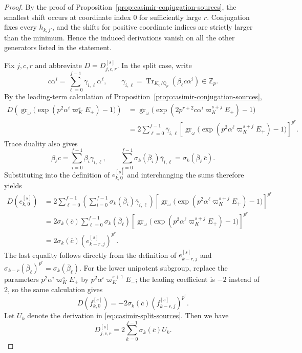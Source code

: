 \documentclass[11pt]{article}
\numberwithin{equation}{section}
\theoremstyle{definition}
\theoremstyle{remark}
\newcommand{\Q}{\mathbb Q}
\newcommand{\Z}{\mathbb Z}
\DeclareMathOperator{\gr}{gr}
\begin{document}
\begin{proof}
By the proof of Proposition~\ref{prop:casimir-conjugation-sources},
the smallest shift occurs at coordinate index $0$ for sufficiently
large $r$. Conjugation fixes every $h_{k,j'}$, and the shifts for
positive coordinate indices are strictly larger than the minimum.
Hence the induced derivations
vanish on all the other generators listed in the statement.

Fix $j,c,r$ and abbreviate $D=D^{[s]}_{j,c,r}$.
In the split case, write
\[
 c\alpha^i=\sum_{\ell=0}^{f-1}\gamma_{i,\ell}\alpha^\ell,
 \qquad
 \gamma_{i,\ell}
 =\operatorname{Tr}_{K_0/\Q_p}(\beta_\ell c\alpha^i)\in\Z_p.
\]
By the leading-term calculation of
Proposition~\ref{prop:casimir-conjugation-sources},
\[
 \begin{aligned}
 D\left(\gr_\omega\bigl(
       \exp(p^2\alpha^i\varpi_K^sE_+)-1\bigr)\right)
 &=\gr_\omega\bigl(
       \exp(2p^{r+2}c\alpha^i\varpi_K^{s+j}E_+)-1\bigr)\\
 &=2\sum_{\ell=0}^{f-1}\overline\gamma_{i,\ell}
       \left[\gr_\omega\bigl(
       \exp(p^2\alpha^\ell\varpi_K^{s+j}E_+)-1\bigr)\right]^{p^r}.
 \end{aligned}
\]
Trace duality also gives
\[
 \beta_\ell c=\sum_{i=0}^{f-1}\beta_i\gamma_{i,\ell},
 \qquad
 \sum_{i=0}^{f-1}\sigma_k(\overline\beta_i)
                  \overline\gamma_{i,\ell}
     =\sigma_k(\overline\beta_\ell\,\overline c).
\]
Substituting into the definition of $e_{k,0}^{[s]}$ and
interchanging the sums therefore yields
\[
 \begin{aligned}
 D(e_{k,0}^{[s]})
 &=2\sum_{\ell=0}^{f-1}
       \left(\sum_{i=0}^{f-1}\sigma_k(\overline\beta_i)
                    \overline\gamma_{i,\ell}\right)
       \left[\gr_\omega\bigl(
       \exp(p^2\alpha^\ell\varpi_K^{s+j}E_+)-1\bigr)\right]^{p^r}\\
 &=2\sigma_k(\overline c)\sum_{\ell=0}^{f-1}
       \sigma_k(\overline\beta_\ell)
       \left[\gr_\omega\bigl(
       \exp(p^2\alpha^\ell\varpi_K^{s+j}E_+)-1\bigr)\right]^{p^r}\\
 &=2\sigma_k(\overline c)(e_{k-r,j}^{[s]})^{p^r}.
 \end{aligned}
\]
The last equality follows directly from the definition of
$e_{k-r,j}^{[s]}$ and
$\sigma_{k-r}(\overline\beta_\ell)^{p^r}=\sigma_k(\overline\beta_\ell)$.
For the lower unipotent subgroup, replace the parameters
$p^2\alpha^i\varpi_K^sE_+$ by
$p^2\alpha^i\varpi_K^{s+1}E_-$; the leading coefficient is
$-2$ instead of $2$, so the same calculation gives
\[
 D(f_{k,0}^{[s]})
   =-2\sigma_k(\overline c)(f_{k-r,j}^{[s]})^{p^r}.
\]
Let $U_k$ denote the derivation in
\eqref{eq:casimir-split-sources}. Then we have 
\[
 D^{[s]}_{j,c,r}=2\sum_{k=0}^{f-1}\sigma_k(\overline c)U_k.
\]


\end{proof}
\end{document}
